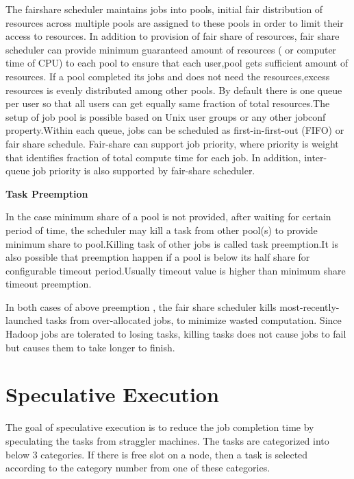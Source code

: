  
The fairshare scheduler maintains jobs into pools, initial fair distribution of resources across multiple pools are assigned to these pools in order to limit their access to resources. In addition to provision of fair share of resources, fair share scheduler can provide minimum guaranteed amount of resources ( or computer time of CPU) to each pool to ensure that each user,pool gets sufficient amount of resources. If a pool completed its jobs and does not need the resources,excess resources is evenly distributed among other pools.\cite{fair}
 By default there is one queue per user so that all users can get equally same fraction of total resources.The setup of job pool is possible based on Unix user groups or any other jobconf property.Within each queue, jobs can be scheduled as first-in-first-out (FIFO) or fair share schedule. Fair-share can support job priority, where priority is weight that identifies fraction of total compute time for each job. In addition,  inter-queue job priority is also supported by fair-share scheduler.\cite{fair}
 
 
 \textbf{Task Preemption}
 
 In the case minimum share of a pool is not provided, after waiting for certain period of time, the scheduler may kill a task from other pool(s) to provide minimum share to pool.Killing task of other jobs is called task preemption.It is also possible that preemption happen if a pool is below its half share for configurable timeout period.Usually timeout value is higher than minimum share timeout preemption.\cite{fair} 
 
In both cases of above preemption , the fair share scheduler kills most-recently-launched tasks from over-allocated jobs, to minimize wasted computation. Since Hadoop jobs are tolerated to losing tasks, killing tasks does not cause jobs to fail but causes them to take longer to finish.\cite{fair}
 














\section{Speculative Execution}

The goal of speculative execution is to reduce the job completion time by speculating the tasks from straggler machines. The tasks are categorized into below 3 categories. If there is free slot on a node, then a task is selected according to the category number from one of these categories.  

